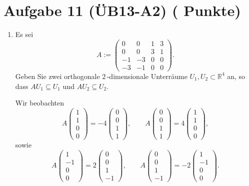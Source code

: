 \documentclass[11pt, a4paper]{article}
\newcommand{\aufgabe}[2]{%
  \section*{\Large\bfseries Aufgabe #1%
  \if\relax\detokenize{#2}\relax\else \hfill\normalfont\normalsize(#2 Punkte)\fi}%
  \vspace{-1.5ex}
}
\begin{document}
\aufgabe{11 (ÜB13-A2)}{}
\begin{enumerate}
  \item Es sei
  \[
    A:=
    \begin{pmatrix}
      0 & 0 & 1 & 3\\
      0 & 0 & 3 & 1\\
     -1 & -3 & 0 & 0\\
     -3 & -1 & 0 & 0
    \end{pmatrix}.
  \]
  Geben Sie zwei orthogonale 2\,-dimensionale Unterräume $U_1,U_2\subset \mathbb{R}^4$ an, so dass $AU_1\subseteq U_1$ und $AU_2\subseteq U_2$.
  \begin{framed}
  Wir beobachten
  \[
    A\!\begin{pmatrix}1\\1\\0\\0\end{pmatrix}=-4\!\begin{pmatrix}0\\0\\1\\1\end{pmatrix},
    \qquad
    A\!\begin{pmatrix}0\\0\\1\\1\end{pmatrix}=4\!\begin{pmatrix}1\\1\\0\\0\end{pmatrix},
  \]
  sowie
  \[
    A\!\begin{pmatrix}1\\-1\\0\\0\end{pmatrix}=2\!\begin{pmatrix}0\\0\\1\\-1\end{pmatrix},
    \qquad
    A\!\begin{pmatrix}0\\0\\1\\-1\end{pmatrix}=-2\!\begin{pmatrix}1\\-1\\0\\0\end{pmatrix}.
\]
\end{framed}
\end{enumerate}
\end{document}

